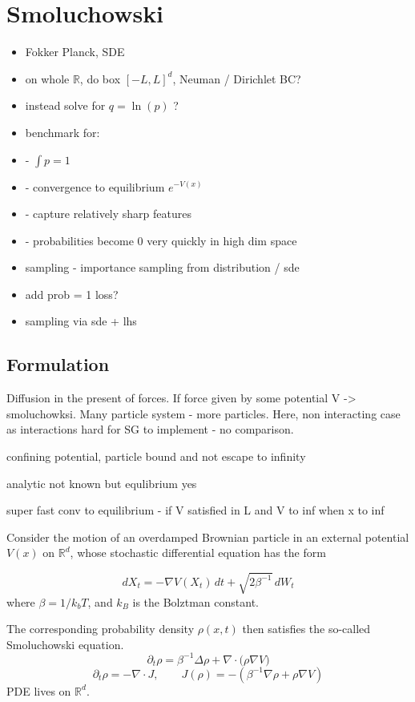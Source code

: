 
\chapter{Smoluchowski}

{
\color{red}
\begin{itemize}
\item Fokker Planck, SDE
\item on whole $\mathbb R$, do box $[-L,L]^d$, Neuman / Dirichlet BC?
\item instead solve for $q=\ln(p)$ ?
\item benchmark for:
\item - $\int p = 1$
\item - convergence to equilibrium $e^{-V(x)}$
\item - capture relatively sharp features
\item - probabilities become 0 very quickly in high dim space

\item sampling - importance sampling from distribution / sde
\item add prob = 1 loss?
\item sampling via sde + lhs

\end{itemize}

}


\section{Formulation}

Diffusion in the present of forces.
If force given by some potential V -> smoluchowksi.\cite{kneller}
Many particle system - more particles.
Here, non interacting case as interactions hard for SG to implement - no comparison.

confining potential, particle bound and not escape to infinity

analytic not known but equlibrium yes

super fast conv to equilibrium - if V satisfied in L and V to inf when x to inf 
\cite{pavliotis}


Consider the motion of an overdamped Brownian particle in an external potential $V(x)$ on $\mathbb{R}^d$, whose stochastic differential equation has the form

$$
dX_t = -\nabla V(X_t)\,dt + \sqrt{2\beta^{-1}}\,dW_t
$$ 
where $\beta = 1/k_b T$, and $k_B$ is the Bolztman constant.

The corresponding probability density $\rho(x,t)$ then satisfies the so-called Smoluchowski equation.
$$
\partial_t \rho = \beta^{-1}\Delta\rho + \nabla\cdot\bigl(\rho\nabla V\bigr)
$$
$$
\partial_t\rho = -\nabla\cdot J,\qquad J(\rho) = -(\beta^{-1}\nabla\rho + \rho\nabla V)
$$ 
PDE lives on $\mathbb R^d$.


